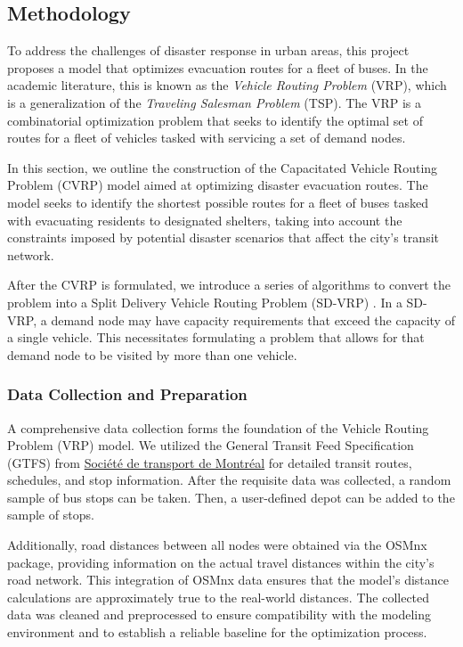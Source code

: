 \documentclass[12pt]{article}
\begin{document}
\subsection{Methodology}
To address the challenges of disaster response in urban areas, this project proposes a model that optimizes evacuation routes for a fleet of buses.
In the academic literature, this is known as the \textit{Vehicle Routing Problem} (VRP), which is a generalization of the \textit{Traveling Salesman Problem} (TSP).
The VRP is a combinatorial optimization problem that seeks to identify the optimal set of routes for a fleet of vehicles tasked with servicing a set of demand nodes.


In this section, we outline the construction of the Capacitated Vehicle Routing Problem (CVRP) model aimed at optimizing disaster evacuation routes.
The model seeks to identify the shortest possible routes for a fleet of buses tasked with evacuating residents to designated shelters, taking into account the constraints imposed by potential disaster scenarios that affect the city's transit network.

After the CVRP is formulated, we introduce a series of algorithms to convert the problem into a Split Delivery Vehicle Routing Problem (SD-VRP) \cite{DROR1994239}.
In a SD-VRP, a demand node may have capacity requirements that exceed the capacity of a single vehicle.
This necessitates formulating a problem that allows for that demand node to be visited by more than one vehicle.


\subsubsection{Data Collection and Preparation}

A comprehensive data collection forms the foundation of the Vehicle Routing Problem (VRP) model.
We utilized the General Transit Feed Specification (GTFS) from \href{https://www.stm.info/en/about/developers}{Société de transport de Montréal} for detailed transit routes, schedules, and stop information.
After the requisite data was collected, a random sample of bus stops can be taken. Then, a user-defined depot can be added to the sample of stops.

Additionally, road distances between all nodes were obtained via the OSMnx\cite{BOEING2017126} package, providing information on the actual travel distances within the city's road network.
This integration of OSMnx data ensures that the model's distance calculations are approximately true to the real-world distances.
The collected data was cleaned and preprocessed to ensure compatibility with the modeling environment and to establish a reliable baseline for the optimization process.
\end{document}
